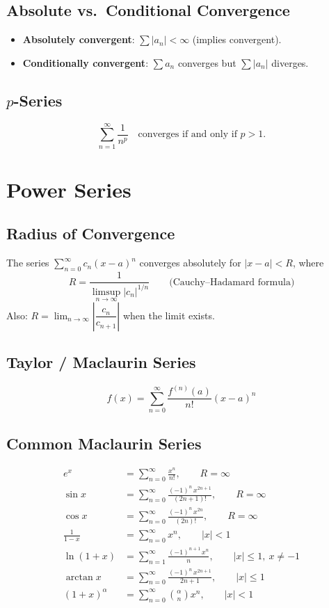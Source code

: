 \documentclass[12pt, a4paper]{article}
\theoremstyle{definition}
\theoremstyle{remark}
\begin{document}
\subsection{Absolute vs.\ Conditional Convergence}
\begin{itemize}
  \item \textbf{Absolutely convergent}: $\sum |a_n| < \infty$ (implies convergent).
  \item \textbf{Conditionally convergent}: $\sum a_n$ converges but $\sum |a_n|$ diverges.
\end{itemize}

\subsection{$p$-Series}
\[
  \sum_{n=1}^\infty \frac{1}{n^p} \quad \text{converges if and only if } p > 1.
\]

\section{Power Series}

\subsection{Radius of Convergence}
The series $\displaystyle\sum_{n=0}^\infty c_n (x-a)^n$ converges absolutely for $|x-a| < R$, where
\[
  R = \frac{1}{\displaystyle\limsup_{n\to\infty} |c_n|^{1/n}}
  \qquad \text{(Cauchy--Hadamard formula)}
\]
Also: $R = \lim_{n\to\infty} \left|\dfrac{c_n}{c_{n+1}}\right|$ when the limit exists.

\subsection{Taylor / Maclaurin Series}
\[
  f(x) = \sum_{n=0}^\infty \frac{f^{(n)}(a)}{n!}(x-a)^n
\]

\subsection{Common Maclaurin Series}
\begin{align*}
  e^x &= \sum_{n=0}^\infty \frac{x^n}{n!}, \qquad R = \infty \\[6pt]
  \sin x &= \sum_{n=0}^\infty \frac{(-1)^n\, x^{2n+1}}{(2n+1)!}, \qquad R = \infty \\[6pt]
  \cos x &= \sum_{n=0}^\infty \frac{(-1)^n\, x^{2n}}{(2n)!}, \qquad R = \infty \\[6pt]
  \frac{1}{1-x} &= \sum_{n=0}^\infty x^n, \qquad |x| < 1 \\[6pt]
  \ln(1+x) &= \sum_{n=1}^\infty \frac{(-1)^{n+1}\, x^n}{n}, \qquad |x| \le 1,\ x \ne -1 \\[6pt]
  \arctan x &= \sum_{n=0}^\infty \frac{(-1)^n\, x^{2n+1}}{2n+1}, \qquad |x| \le 1 \\[6pt]
  (1+x)^\alpha &= \sum_{n=0}^\infty \binom{\alpha}{n} x^n, \qquad |x| < 1
\end{align*}
\end{document}
